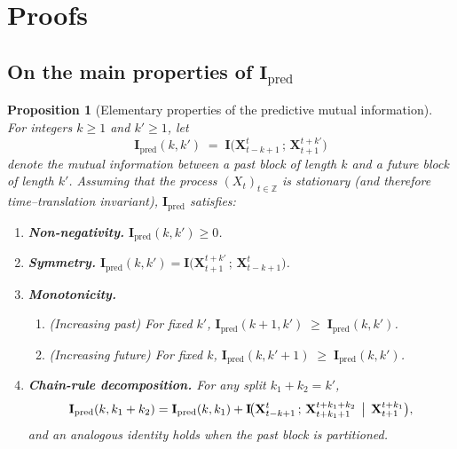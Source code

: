 \documentclass{article}
\newtheorem{proposition}[theorem]{Proposition}
\begin{document}
\startcontents[appendix]

\clearpage

\section{Proofs}
\label{appendix:partA}
\subsection{On the main properties of $\mathbf{I}_{\text{pred}}$}


\begin{proposition}[Elementary properties of the predictive mutual information]
\label{prop:basic_Ipred_properties}
For integers $k\!\ge 1$ and $k'\!\ge 1$, let
\[
\mathbf I_{\mathrm{pred}}(k,k')
\;=\;
\mathbf I\!\bigl(\mathbf X_{t-k+1}^{t}\,;\, \mathbf X_{t+1}^{t+k'}\bigr)
\]
denote the mutual information between a past block of length $k$ and a future
block of length $k'$.  
Assuming that the process $(X_t)_{t\in\mathbb Z}$ is
stationary (and therefore time–translation invariant),  
$\mathbf I_{\mathrm{pred}}$ satisfies:

\begin{enumerate}
    \item \textbf{Non-negativity.}\;
          $\mathbf I_{\mathrm{pred}}(k,k') \ge 0$.

    \item \textbf{Symmetry.}\;
          $\mathbf I_{\mathrm{pred}}(k,k')
           = \mathbf I\!\bigl(\mathbf X_{t+1}^{t+k'}\,;\, \mathbf X_{t-k+1}^{t}\bigr)$.

    \item \textbf{Monotonicity.}
          \begin{enumerate}
              \item (Increasing past) For fixed $k'$,  
                    $\mathbf I_{\mathrm{pred}}(k+1,k')\;\ge\;
                     \mathbf I_{\mathrm{pred}}(k,k')$.
              \item (Increasing future) For fixed $k$,  
                    $\mathbf I_{\mathrm{pred}}(k,k'+1)\;\ge\;
                     \mathbf I_{\mathrm{pred}}(k,k')$.
          \end{enumerate}

    \item \textbf{Chain-rule decomposition.}\;
          For any split $k_1+k_2=k'$,
          \[
            \mathbf I_{\mathrm{pred}}(k,k_1+k_2)
            = \mathbf I_{\mathrm{pred}}(k,k_1)
            + \mathbf I\!\bigl(
                 \mathbf X_{t-k+1}^{t}\,;\,
                 \mathbf X_{t+k_1+1}^{t+k_1+k_2}
                 \,\bigm|\,
                 \mathbf X_{t+1}^{t+k_1}
              \bigr),
          \]
          and an analogous identity holds when the past block is partitioned.


\end{enumerate}
\end{proposition}
\end{document}
